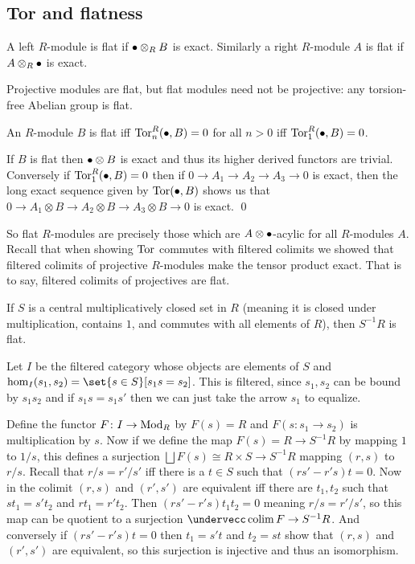 \eexam

\subsection{Tor and flatness}

\bdefn

    A left $R$-module is {\emphcolor flat} if $\bullet\otimes_RB$ is exact.
    Similarly a right $R$-module $A$ is {\emphcolor flat} if $A\otimes_R\bullet$ is exact.

\edefn

Projective modules are flat, but flat modules need not be projective: any torsion-free Abelian group is flat.

\bprop

    An $R$-module $B$ is flat iff ${\rm Tor}^R_n(\bullet,B)=0$ for all $n>0$ iff ${\rm Tor}^R_1(\bullet,B)=0$.

\eprop

\bproof

    If $B$ is flat then $\bullet\otimes B$ is exact and thus its higher derived functors are trivial.
    Conversely if ${\rm Tor}^R_1(\bullet,B)=0$ then if $0\to A_1\to A_2\to A_3\to0$ is exact, then the long exact sequence given by ${\rm Tor}(\bullet,B)$ shows us that
    $0\to A_1\otimes B\to A_2\otimes B\to A_3\otimes B\to0$ is exact.
    \qed

\eproof

So flat $R$-modules are precisely those which are $A\otimes\bullet$-acylic for all $R$-modules $A$.
Recall that when showing ${\rm Tor}$ commutes with filtered colimits we showed that filtered colimits of projective $R$-modules make the tensor product exact.
That is to say, filtered colimits of projectives are flat.

\bthrm

    If $S$ is a central multiplicatively closed set in $R$ (meaning it is closed under multiplication, contains $1$, and commutes with all elements of $R$), then $S^{-1}R$ is flat.

\ethrm

\bproof

    Let $I$ be the filtered category whose objects are elements of $S$ and $\hom_I(s_1,s_2)=\set{s\in S}[s_1s=s_2]$.
    This is filtered, since $s_1,s_2$ can be bound by $s_1s_2$ and if $s_1s=s_1s'$ then we can just take the arrow $s_1$ to equalize.

    Define the functor $F\colon I\to{\rm Mod}_R$ by $F(s)=R$ and $F(s\colon s_1\to s_2)$ is multiplication by $s$.
    Now if we define the map $F(s)=R\to S^{-1}R$ by mapping $1$ to $1/s$, this defines a surjection $\bigsqcup F(s)\cong R\times S\to S^{-1}R$ mapping $(r,s)$ to $r/s$.
    Recall that $r/s=r'/s'$ iff there is a $t\in S$ such that $(rs'-r's)t=0$.
    Now in the colimit $(r,s)$ and $(r',s')$ are equivalent iff there are $t_1,t_2$ such that $st_1=s't_2$ and $rt_1=r't_2$.
    Then $(rs'-r's)t_1t_2=0$ meaning $r/s=r'/s'$, so this map can be quotient to a surjection $\coflim F\to S^{-1}R$.
    And conversely if $(rs'-r's)t=0$ then $t_1=s't$ and $t_2=st$ show that $(r,s)$ and $(r',s')$ are equivalent, so this surjection is injective and thus an isomorphism.

